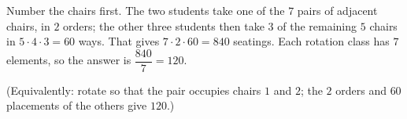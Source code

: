 Number the chairs first. The two students take one of the $7$ pairs of adjacent chairs, in $2$ orders; the other three students then take $3$ of the remaining $5$ chairs in $5\cdot4\cdot3=60$ ways. That gives $7\cdot2\cdot60=840$ seatings. Each rotation class has $7$ elements, so the answer is $\dfrac{840}{7}=\boxed{120}$.

(Equivalently: rotate so that the pair occupies chairs $1$ and $2$; the $2$ orders and $60$ placements of the others give $120$.)
